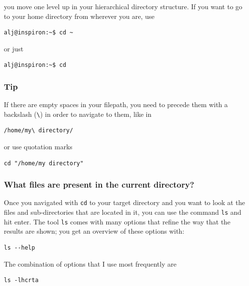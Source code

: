 \documentclass[11pt]{article}
\begin{document}
you move one level up in your hierarchical directory structure.  If
you want to go to your home directory from wherever you are, use

\begin{verbatim}
alj@inspiron:~$ cd ~
\end{verbatim}

or just

\begin{verbatim}
alj@inspiron:~$ cd
\end{verbatim}

\subsubsection{Tip}
\label{sec:orgheadline4}
If there are empty spaces in your filepath, you need to precede them
with a backslash (\texttt{\textbackslash{}}) in order to navigate to them, like in 

\begin{verbatim}
/home/my\ directory/
\end{verbatim}

or use quotation marks

\begin{verbatim}
cd "/home/my directory"
\end{verbatim}

\subsubsection{What files are present in the current directory?}
\label{sec:orgheadline5}
Once you navigated with \texttt{cd} to your target directory and you want to
look at the files and sub-directories that are located in it, you can
use the command \texttt{ls} and hit enter. The tool \texttt{ls} comes with many
options that refine the way that the results are shown; you get an
overview of these options with:

\begin{verbatim}
ls --help
\end{verbatim}

The combination of options that I use most frequently are

\begin{verbatim}
ls -lhcrta
\end{verbatim}
\end{document}
